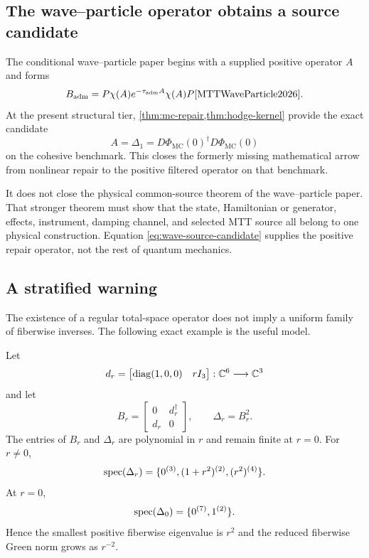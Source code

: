 \documentclass[11pt,a4paper]{article}
\newcommand{\MC}{\mathrm{MC}}
\begin{document}
\subsection{The wave--particle operator obtains a source candidate}

The conditional wave--particle paper begins with a supplied positive
operator \(A\) and forms
\[
B_{\mathrm{adm}}
=P\chi(A)e^{-\tau_{\mathrm{adm}}A}\chi(A)P
\cite{MTTWaveParticle2026}.
\]
At the present structural tier, \cref{thm:mc-repair,thm:hodge-kernel}
provide the exact candidate
\begin{equation}
A=\Delta_1=D\Phi_{\MC}(0)^{\dagger}D\Phi_{\MC}(0)
\label{eq:wave-source-candidate}
\end{equation}
on the cohesive benchmark.  This closes the formerly missing mathematical
arrow from nonlinear repair to the positive filtered operator on that
benchmark.

It does not close the physical common-source theorem of the wave--particle
paper.  That stronger theorem must show that the state, Hamiltonian or
generator, effects, instrument, damping channel, and selected MTT source all
belong to one physical construction.  Equation
\eqref{eq:wave-source-candidate} supplies the positive repair operator, not
the rest of quantum mechanics.

\subsection{A stratified warning}

The existence of a regular total-space operator does not imply a uniform
family of fiberwise inverses.  The following exact example is the useful
model.

\begin{proposition}
\label{prop:stratified-green}
Let
\[
d_r=\begin{bmatrix}
\operatorname{diag}(1,0,0)&rI_3
\end{bmatrix}:\mathbb{C}^6\longrightarrow\mathbb{C}^3
\]
and let
\[
B_r=\begin{bmatrix}0&d_r^{\dagger}\\d_r&0\end{bmatrix},
\qquad
\Delta_r=B_r^2.
\]
The entries of \(B_r\) and \(\Delta_r\) are polynomial in \(r\) and remain
finite at \(r=0\).  For \(r\neq0\),
\[
\operatorname{spec}(\Delta_r)=
\{0^{(3)},(1+r^2)^{(2)},(r^2)^{(4)}\}.
\]
At \(r=0\),
\[
\operatorname{spec}(\Delta_0)=\{0^{(7)},1^{(2)}\}.
\]
Hence the smallest positive fiberwise eigenvalue is \(r^2\) and the reduced
fiberwise Green norm grows as \(r^{-2}\).
\end{proposition}
\end{document}
